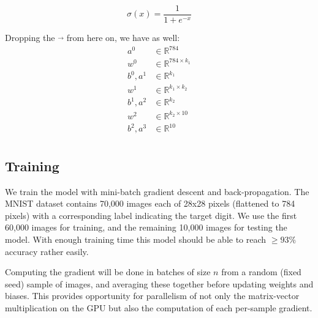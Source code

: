 \documentclass[sigconf,authorversion,nonacm]{acmart}
\begin{document}
\begin{equation}
    \sigma(x) = \frac{1}{1+e^{-x}}
    \label{eq:sigmoid}
\end{equation}

Dropping the $\vec{ }$\hspace{2pt} from here on, we have as  well:
\begin{align*}
    a^0&\in\mathbb{R}^{784} \\
    w^0&\in\mathbb{R}^{784\times k_1} \\
    b^0, a^1&\in\mathbb{R}^{k_1}\\
    w^1&\in\mathbb{R}^{k_1\times k_2} \\
    b^1, a^2&\in\mathbb{R}^{k_2}\\
    w^2&\in\mathbb{R}^{k_2\times 10} \\
    b^2, a^3&\in\mathbb{R}^{10}\\
\end{align*}


\subsection{Training}

We train the model with mini-batch gradient descent and back-propagation. The MNIST dataset contains 70,000 images each of 28x28 pixels (flattened to 784 pixels) with a corresponding label indicating the target digit. We use the first 60,000 images for training, and the remaining 10,000 images for testing the model. With enough training time this model should be able to reach $\geq 93\%$ accuracy rather easily.

Computing the gradient will be done in batches of size $n$ from a random (fixed seed) sample of images, and averaging these together before updating weights and biases. This provides opportunity for parallelism of not only the matrix-vector multiplication on the GPU but also the computation of each per-sample gradient.
\end{document}
